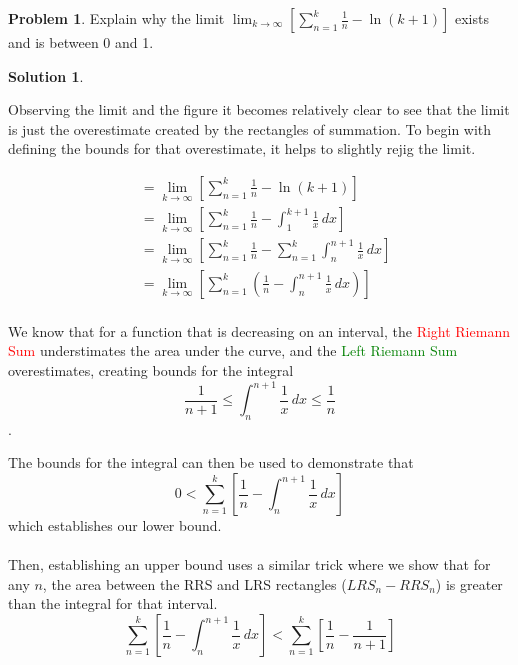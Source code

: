 \documentclass[10pt]{article}
\theoremstyle{definition}
\newtheorem{problem}{Problem}
\newtheorem{soln}{Solution}
\begin{document}
\begin{problem}
Explain why the limit $\lim_{k \to \infty} \left[\sum_{n = 1}^{k} \frac{1}{n} - \ln(k+1)\right]$ exists and is between 0 and 1.
\end{problem}
\begin{soln} ~\\
    \begin{center}
    \end{center}

    \noindent Observing the limit and the figure it becomes relatively clear to see that the limit is just the overestimate created by the rectangles of summation. To begin with defining the bounds for
    that overestimate, it helps to slightly rejig the limit.

    \begin{align*}
         & = \lim_{k \to \infty} \left[\sum_{n = 1}^{k} \frac{1}{n} - \ln(k+1)\right]                                         \\
         & = \lim_{k \to \infty} \left[\sum_{n = 1}^{k} \frac{1}{n} - \int_{1}^{k+1} \frac{1}{x} \,dx \right]                 \\
         & = \lim_{k \to \infty} \left[\sum_{n = 1}^{k} \frac{1}{n} - \sum_{n = 1}^{k}\int_{n}^{n+1} \frac{1}{x} \,dx \right] \\
         & = \lim_{k \to \infty} \left[\sum_{n = 1}^{k} \left(\frac{1}{n} - \int_{n}^{n+1} \frac{1}{x} \,dx \right)\right]    \\
    \end{align*}

    \noindent We know that for a function that is decreasing on an interval, the \textcolor{red}{Right Riemann Sum} understimates the area under the curve, and the \textcolor{green}{Left Riemann Sum} overestimates, creating bounds for the integral
    $$\frac{1}{n+1}\leq\int_{n}^{n+1} \frac{1}{x} \,dx\leq \frac{1}{n}$$.

    \noindent The bounds for the integral can then be used to demonstrate that
    $$0 < \sum_{n = 1}^{k}\left[ \frac{1}{n} - \int_{n}^{n+1} \frac{1}{x} \,dx\right]$$
    \noindent which establishes our lower bound.
    ~\\
    ~\\
    \noindent Then, establishing an upper bound uses a similar trick where we show that for any $n$, the area between the RRS and LRS rectangles ($LRS_n - RRS_n$) is greater than
    the integral for that interval.
    $$\sum_{n = 1}^{k}\left[ \frac{1}{n} - \int_{n}^{n+1} \frac{1}{x} \,dx\right] < \sum_{n = 1}^{k}\left[\frac{1}{n} - \frac{1}{n+1}\right]$$


\end{soln}
\end{document}
